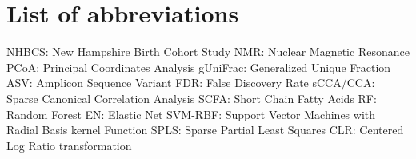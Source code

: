 \chapter{List of abbreviations}

NHBCS: New Hampshire Birth Cohort Study
NMR: Nuclear Magnetic Resonance
PCoA: Principal Coordinates Analysis
gUniFrac: Generalized Unique Fraction 
ASV: Amplicon Sequence Variant
FDR: False Discovery Rate
sCCA/CCA: Sparse Canonical Correlation Analysis
SCFA: Short Chain Fatty Acids
RF: Random Forest
EN: Elastic Net
SVM-RBF: Support Vector Machines with Radial Basis kernel Function
SPLS: Sparse Partial Least Squares
CLR:  Centered Log Ratio transformation